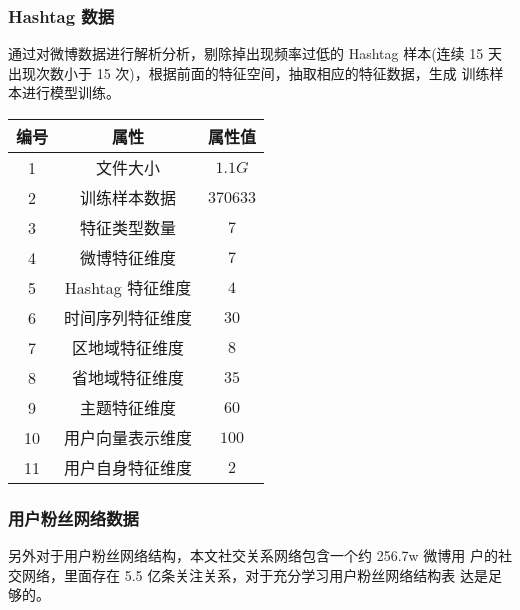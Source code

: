 \subsubsection{Hashtag 数据}
通过对微博数据进行解析分析，剔除掉出现频率过低的 Hashtag 样本(连续 15 天出现次数小于 15 次)，根据前面的特征空间，抽取相应的特征数据，生成 训练样本进行模型训练。
\begin{table}[H]
    \centering
    \footnotesize%
      \label{tab:3_3}
    \setlength{\tabcolsep}{30pt}%
    \renewcommand{\arraystretch}{1.2}%
    \begin{tabular}{ccc}
        \hline
        \textbf{编号} & \textbf{属性} & \textbf{属性值} \\
        \hline
         1 & 文件大小 & $1.1G$ \\
         2 &训练样本数据& $370633$\\
         3 & 特征类型数量 & $7$ \\
         4 &微博特征维度& $7$\\
       	5 &Hashtag 特征维度& $4$\\
       	6 &时间序列特征维度& $30$ \\
       	7 & 区地域特征维度& $8$\\
       	8 &省地域特征维度& $35$\\
       	9 &主题特征维度& $60$\\
       	10 & 用户向量表示维度 & $100$\\
       	11&用户自身特征维度& $2$\\

        	\hline
    \end{tabular}

\end{table}

\subsubsection{用户粉丝网络数据}
另外对于用户粉丝网络结构，本文社交关系网络包含一个约 256.7w 微博用 户的社交网络，里面存在 5.5 亿条关注关系，对于充分学习用户粉丝网络结构表 达是足够的。

